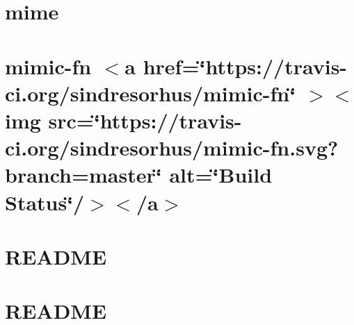 \documentclass[twoside]{book}
\newcommand{\+}{\discretionary{\mbox{\scriptsize$\hookleftarrow$}}{}{}}
\begin{document}
\chapter{mime}
\label{md__c___users_vaishnavi_jadhav__desktop__developer_code_mean_stack_example_client_node_modules_mime__r_e_a_d_m_e}

\chapter{mimic-\/fn \texorpdfstring{$<$}{<}a href=\char`\"{}https\+://travis-\/ci.\+org/sindresorhus/mimic-\/fn\char`\"{} \texorpdfstring{$>$}{>}\texorpdfstring{$<$}{<}img src=\char`\"{}https\+://travis-\/ci.\+org/sindresorhus/mimic-\/fn.\+svg?branch=master\char`\"{} alt=\char`\"{}\+Build Status\char`\"{}/\texorpdfstring{$>$}{>}\texorpdfstring{$<$}{<}/a\texorpdfstring{$>$}{>}}
\label{md__c___users_vaishnavi_jadhav__desktop__developer_code_mean_stack_example_client_node_modules_mimic_fn_readme}

\chapter{README}
\label{md__c___users_vaishnavi_jadhav__desktop__developer_code_mean_stack_example_client_node_modules_m6c32dee70b92cfc0c58b3ef4b290b4d1}

\chapter{README}
\label{md__c___users_vaishnavi_jadhav__desktop__developer_code_mean_stack_example_client_node_modules_m8f5b45cb5216a04e7757b6ac52597d9a}

\end{document}
